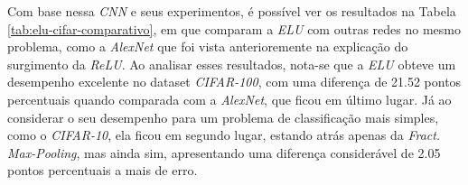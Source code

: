 Com base nessa \textit{CNN} e seus experimentos, é possível ver os resultados na Tabela \ref{tab:elu-cifar-comparativo}, em que \textcite{ELUArticle} comparam a \textit{ELU} com outras redes no mesmo problema, como a \textit{AlexNet} que foi vista anterioremente na explicação do surgimento da \textit{ReLU}. Ao analisar esses resultados, nota-se que a \textit{ELU} obteve um desempenho excelente no dataset \textit{CIFAR-100}, com uma diferença de 21.52 pontos percentuais quando comparada com a \textit{AlexNet}, que ficou em último lugar. Já ao considerar o seu desempenho para um problema de classificação mais simples, como o \textit{CIFAR-10}, ela ficou em segundo lugar, estando atrás apenas da \textit{Fract. Max-Pooling}, mas ainda sim, apresentando uma diferença considerável de 2.05 pontos percentuais a mais de erro. 

